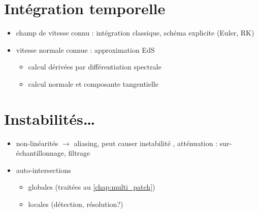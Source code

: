 \section{Intégration temporelle}%
\begin{itemize}
	\item champ de vitesse connu : intégration classique, schéma explicite (Euler, RK)
	\item vitesse normale connue : approximation EdS
	\begin{itemize}
		\item calcul dérivées par différentiation spectrale
		\item calcul normale et composante tangentielle
	\end{itemize}
\end{itemize}


\section{Instabilités\ldots}
\begin{itemize}
	\item non-linéarités $\to$ aliasing, peut causer instabilité \cite{rahimian2015}, atténuation : sur-échantillonnage, filtrage
	\item auto-intersections
	\begin{itemize}
		\item globales (traitées au \autoref{chap:multi_patch})
		\item locales \cite{farouki1986} (détection, résolution?)
	\end{itemize}
\end{itemize}
